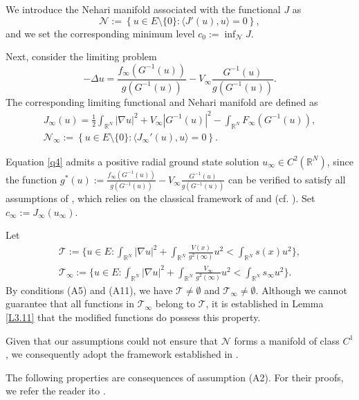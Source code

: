 \documentclass[10pt,a4paper]{amsart}
\numberwithin{equation}{section}
\begin{document}
We introduce the Nehari manifold associated with the functional $J$ as
$$
\mathcal{N}:=\left\{u\in E\setminus \{0\}: \langle J'(u),u\rangle=0\right\},
$$ 
and we set the corresponding minimum level $c_0:=\inf_{\mathcal{N}}J$.

Next, consider the limiting problem
\begin{equation}
\label{q4}
-\Delta u= \frac{f_{\infty}(G^{-1}(u))}{g(G^{-1}(u))}-V_{\infty}\frac{G^{-1}(u)}{g(G^{-1}(u))}.
\end{equation}
 The corresponding limiting functional and Nehari manifold are defined as
\begin{gather}
\label{q5}
J_{\infty}(u)=\frac{1}{2}\int_{\mathbb{R}^{N}}|\nabla u|^{2}+V_{\infty}|G^{-1}(u)|^2-\int_{\mathbb{R}^{N}}F_{\infty}(G^{-1}(u)), \\
\label{q6}
\mathcal{N_{\infty}}:=\left\{u\in E\setminus \{0\}: \langle J_{\infty}'(u),u\rangle=0\right\}.
\end{gather}  

Equation \eqref{q4} admits a positive radial ground state solution 
$u_{\infty} \in C^2(\mathbb{R}^N)$, since the function 
$g^*(u):=\frac{f_{\infty}(G^{-1}(u))}{g(G^{-1}(u))}-V_{\infty}\frac{G^{-1}(u)}{g(G^{-1}(u))}$ can be 
verified to satisfy all assumptions of \cite[Theorem 3.1]{colin}, which  relies on the classical 
framework of \cite{Berestycki2} and \cite{Berestycki} (cf. \cite{colin}). 
Set $c_\infty:=J_\infty(u_\infty)$.


Let 
\begin{gather*}
\mathcal{T}:=\big\{u\in E: \int_{\mathbb{R}^N}|\nabla u|^2+\int_{\mathbb{R}^N}\frac{V(x)}{g^2(\infty)}u^2<\int_{\mathbb{R}^N}s(x)u^2\big\},\\
\mathcal{T_{\infty}}:=\big\{u\in E: \int_{\mathbb{R}^N}|\nabla u|^2+\int_{\mathbb{R}^N}\frac{V_\infty}{g^2(\infty)}u^2<\int_{\mathbb{R}^N}s_{\infty}u^2\big\}.
\end{gather*}
 By conditions (A5) and (A11), we have 
 $\mathcal{T} \neq \emptyset $ and $\mathcal{T}_\infty \neq \emptyset $. 
 Although we cannot guarantee that all functions in $\mathcal{T_{\infty}}$ belong to 
 $\mathcal{T}$, it is established in Lemma \ref{L3.11} that the modified functions do 
 possess this property.
 
Given that our assumptions could not ensure that $\mathcal{N}$  forms a manifold of 
class $C^1$, we consequently adopt the framework established in \cite{Szulkin1, Szulkin2}.
 

The following properties are consequences of assumption (A2). For their proofs, we refer the reader ito \cite{shen, deng}.
\end{document}
